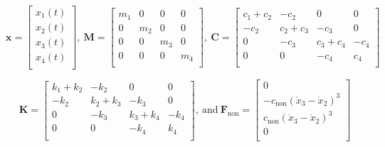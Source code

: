\begin{equation*}
    \mathbf{x}=\left[\begin{matrix}
    {{x}_{1}}(t)  \\
    {{x}_{2}}(t)  \\
    {{x}_{3}}(t)  \\
    {{x}_{4}}(t)  \\
    \end{matrix} \right],\ \mathbf{M}=\left[\begin{matrix}
    {m}_{1} & 0 & 0 & 0  \\
    0 & {m}_{2} & 0 & 0  \\
    0 & 0 & {m}_{3} & 0  \\
    0 & 0 & 0 & {m}_{4}  \\
    \end{matrix} \right],\ \mathbf{C}=\left[\begin{matrix}
    {{c}_{1}}+{{c}_{2}} & -{c}_{2} & 0 & 0  \\
    -{c}_{2} & {{c}_{2}}+{{c}_{3}} & -{c}_{3} & 0  \\
    0 & -{c}_{3} & {{c}_{3}}+{{c}_{4}} & -{c}_{4}  \\
    0 & 0 & -{c}_{4} & {c}_{4}  \\
    \end{matrix} \right]
\end{equation*}

\begin{equation*}
    \mathbf{K}=\left[ \begin{matrix}
    {{k}_{1}}+{{k}_{2}} & -{k}_{2} & 0 & 0  \\
    -{k}_{2} & {{k}_{2}}+{{k}_{3}} & -{k}_{3} & 0  \\
    0 & -{k}_{3} & {{k}_{3}}+{{k}_{4}} & -{k}_{4}  \\
    0 & 0 & -{k}_{4} & {k}_{4}  \\
    \end{matrix} \right],\ \text{and} \ {\mathbf{F}_\text{non}}=\left[ \begin{matrix}
    0  \\
    -{{c}_{\text{non}}}{{({\dot{x}_{3}}-{\dot{x}_{2}})}^{3}}  \\
    {{c}_\text{non}}{{({\dot{x}_{3}}-{\dot{x}_{2}})}^{3}}  \\
    0  \\
    \end{matrix} \right]
\end{equation*}

